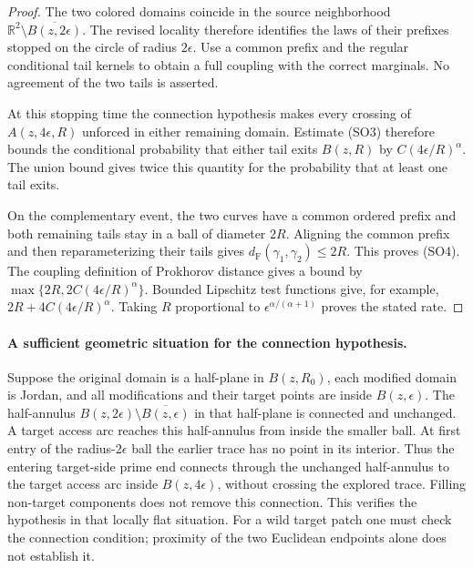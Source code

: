 \documentclass[11pt]{article}
\theoremstyle{definition}\newtheorem{definition}[theorem]{Definition}
\theoremstyle{remark}\newtheorem{remark}[theorem]{Remark}
\begin{document}
\begin{proof}
The two colored domains coincide in the source neighborhood
$\mathbb R^2\setminus\overline{B(z,2\epsilon)}$.  The revised locality
therefore identifies the laws of their prefixes stopped on the circle of
radius $2\epsilon$.  Use a common prefix and the regular conditional tail
kernels to obtain a full coupling with the correct marginals.  No agreement
of the two tails is asserted.

At this stopping time the connection hypothesis makes every crossing of
$A(z,4\epsilon,R)$ unforced in either remaining domain.  Estimate (SO3)
therefore bounds the conditional probability that either tail exits
$B(z,R)$ by $C(4\epsilon/R)^\alpha$.  The union bound gives twice this
quantity for the probability that at least one tail exits.

On the complementary event, the two curves have a common ordered prefix
and both remaining tails stay in a ball of diameter $2R$.  Aligning the
common prefix and then reparameterizing their tails gives
$d_{\mathrm F}(\gamma_1,\gamma_2)\leq2R$.  This proves (SO4).
The coupling definition of Prokhorov distance gives a bound by
$\max\{2R,2C(4\epsilon/R)^\alpha\}$.  Bounded Lipschitz test functions
give, for example, $2R+4C(4\epsilon/R)^\alpha$.
Taking $R$ proportional to
$\epsilon^{\alpha/(\alpha+1)}$ proves the stated rate.
\end{proof}

\paragraph{A sufficient geometric situation for the connection hypothesis.}
Suppose the original domain is a half-plane in $B(z,R_0)$, each modified
domain is Jordan, and all modifications and their target points are inside
$B(z,\epsilon)$.  The half-annulus
$B(z,2\epsilon)\setminus\overline{B(z,\epsilon)}$ in that half-plane
is connected and unchanged.  A target access arc reaches this half-annulus
from inside the smaller ball.  At first entry of the radius-$2\epsilon$
ball the earlier trace has no point in its interior.  Thus the entering
target-side prime end connects through the unchanged half-annulus to the
target access arc inside $B(z,4\epsilon)$, without crossing the explored
trace.  Filling non-target components does not remove this connection.
This verifies the hypothesis in that locally flat situation.  For a wild
target patch one must check the connection condition; proximity of the two
Euclidean endpoints alone does not establish it.
\end{document}

